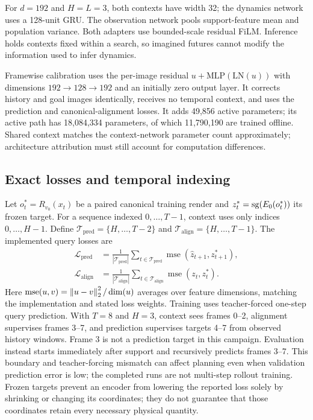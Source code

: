 For $d=192$ and $H=L=3$, both contexts have width 32; the dynamics network
uses a 128-unit GRU. The observation network pools support-feature mean and
population variance. Both adapters use bounded-scale residual FiLM. Inference
holds contexts fixed within a search, so imagined futures cannot modify the
information used to infer dynamics.

Framewise calibration uses the per-image residual
$u+\mathrm{MLP}(\mathrm{LN}(u))$ with dimensions $192\to128\to192$
and an initially zero output layer. It corrects history and goal images
identically, receives no temporal context, and uses the prediction and
canonical-alignment losses. It adds 49,856 active parameters; its active
path has 18,084,334 parameters, of which 11,790,190 are trained offline.
Shared context matches the context-network parameter count approximately;
architecture attribution must still account for computation differences.

\subsection{Exact losses and temporal indexing}
\label{sec:loss-details}
Let $o_t^*=R_{v_0}(x_t)$ be a paired canonical training render and
$z_t^*=\operatorname{sg}(E_0(o_t^*))$ its frozen target. For a sequence indexed $0,\ldots,T-1$, context uses only indices
$0,\ldots,H-1$. Define $\mathcal T_{\mathrm{pred}}=\{H,\ldots,T-2\}$
and $\mathcal T_{\mathrm{align}}=\{H,\ldots,T-1\}$. The implemented query losses are
\begin{align}
 \mathcal L_{\mathrm{pred}}&=\frac{1}{|\mathcal T_{\mathrm{pred}}|}\sum_{t\in\mathcal T_{\mathrm{pred}}}
 \operatorname{mse}(\hat z_{t+1},z_{t+1}^*),\label{eq:predloss}\\
 \mathcal L_{\mathrm{align}}&=\frac{1}{|\mathcal T_{\mathrm{align}}|}\sum_{t\in\mathcal T_{\mathrm{align}}}
 \operatorname{mse}(z_t,z_t^*).\label{eq:alignloss}
\end{align}
Here $\operatorname{mse}(u,v)=\left\lVert u-v\right\rVert_2^2/\dim(u)$ averages over
feature dimensions, matching the implementation and stated loss weights.
Training uses teacher-forced one-step query prediction. With $T=8$ and $H=3$,
context sees frames 0--2, alignment supervises frames 3--7, and prediction
supervises targets 4--7 from observed history windows. Frame 3 is not a
prediction target in this campaign. Evaluation instead starts immediately
after support and recursively predicts frames 3--7. This boundary and
teacher-forcing mismatch can affect planning even when validation prediction
error is low; the completed runs are not multi-step rollout training.
Frozen targets prevent an encoder from lowering the reported
loss solely by shrinking or changing its coordinates; they do not guarantee
that those coordinates retain every necessary physical quantity.

